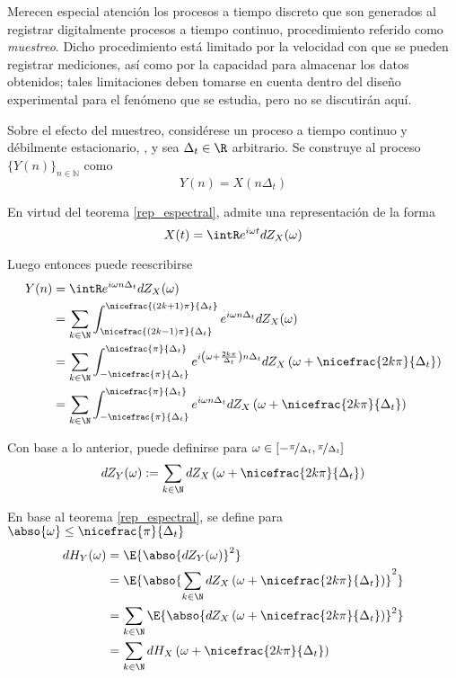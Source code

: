 Merecen especial atención los procesos a tiempo discreto que son generados al registrar 
digitalmente procesos a tiempo continuo, procedimiento referido como \textit{muestreo}.
%
Dicho procedimiento está limitado por la velocidad con que se pueden registrar mediciones, así 
como por la capacidad para almacenar los datos obtenidos; tales limitaciones deben tomarse en 
cuenta dentro del diseño experimental para el fenómeno que se estudia, pero no se discutirán aquí.

Sobre el efecto del muestreo, considérese un proceso a tiempo continuo y débilmente estacionario, 
\xt, y sea $\Delta_t \in \R$ arbitrario.
%
Se construye al proceso $\{Y(n)\}_{n\in \mathbb{N}}$ como
\begin{equation}
Y(n) = X(n \Delta_t)
\end{equation}

En virtud del teorema \ref{rep_espectral}, \xt admite una representación de la forma
\begin{equation}
X(t) = \intR e^{i \omega t }  dZ_X(\omega)
\end{equation}

Luego entonces puede reescribirse
\begin{align}
Y(n) &= \intR e^{i \omega n \Delta_t} dZ_X(\omega) \nonumber \\
&= \sum_{k \in \N} \int_{\nicefrac{(2k-1)\pi}{\Delta_t}}^{\nicefrac{(2k+1)\pi}{\Delta_t}}
e^{i \omega n \Delta_t} dZ_X(\omega) \nonumber \\
&= \sum_{k \in \N} \int_{-\nicefrac{\pi}{\Delta_t}}^{\nicefrac{\pi}{\Delta_t}}
e^{i \left( \omega + \frac{2 k \pi}{\Delta_t} \right) n \Delta_t}
dZ_X\left( \omega + \nicefrac{2 k \pi}{\Delta_t}\right) \nonumber \\
&= \sum_{k \in \N} \int_{-\nicefrac{\pi}{\Delta_t}}^{\nicefrac{\pi}{\Delta_t}}
e^{i \omega n \Delta_t}
dZ_X\left( \omega + \nicefrac{2 k \pi}{\Delta_t}\right)
\end{align}

Con base a lo anterior, puede definirse para 
$\omega \in \left[ -\nicefrac{\pi}{\Delta_t} , \nicefrac{\pi}{\Delta_t} \right]$
\begin{equation}
dZ_Y(\omega) := \sum_{k \in \N} dZ_X\left( \omega + \nicefrac{2 k \pi}{\Delta_t}\right)
\end{equation}

En base al teorema \ref{rep_espectral}, se define para 
$\abso{\omega} \leq \nicefrac{\pi}{\Delta_t}$
\begin{align}
dH_Y(\omega) &= \E{\abso{dZ_Y(\omega)}^{2}} \nonumber \\
&= \E{\abso{\sum_{k \in \N} dZ_X\left( \omega + \nicefrac{2 k \pi}{\Delta_t}\right)}^{2}}
\nonumber \\
&= \sum_{k \in \N} \E{\abso{dZ_X\left( \omega + \nicefrac{2 k \pi}{\Delta_t}\right)}^{2}}
\nonumber \\
&= \sum_{k \in \N} dH_X\left( \omega + \nicefrac{2 k \pi}{\Delta_t}\right)
\end{align}

